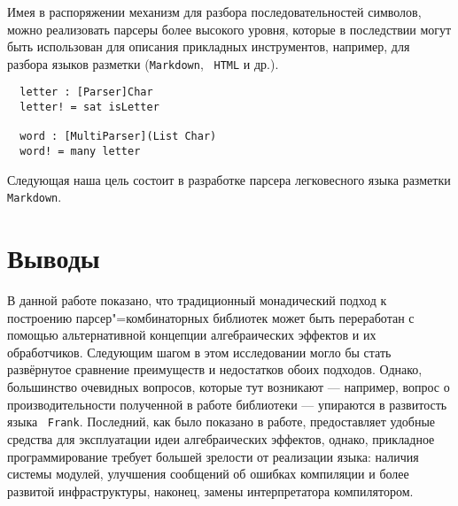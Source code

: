 \documentclass [a4paper] {article}
\begin{document}
Имея в распоряжении механизм для разбора последовательностей символов, можно
реализовать парсеры более высокого уровня, которые в последствии могут быть
использован для описания прикладных инструментов, например, для разбора
языков разметки (\texttt{Markdown}, ~\texttt{HTML} и др.).
\begin{verbatim}
  letter : [Parser]Char
  letter! = sat isLetter

  word : [MultiParser](List Char)
  word! = many letter
\end{verbatim}
Следующая наша цель состоит в разработке парсера легковесного языка разметки
\texttt{Markdown}.

\section{Выводы}

В данной работе показано, что традиционный монадический подход к построению парсер"=комбинаторных библиотек может быть переработан с помощью альтернативной концепции алгебраических эффектов и их обработчиков. Следующим шагом в этом исследовании могло бы стать развёрнутое сравнение преимуществ и недостатков обоих подходов. Однако, большинство очевидных вопросов, которые тут возникают --- например, вопрос о производительности полученной в работе библиотеки --- упираются в развитость языка ~\texttt{Frank}. Последний, как было показано в работе, предоставляет удобные средства для эксплуатации
идеи алгебраических эффектов, однако, прикладное программирование требует большей
зрелости от реализации языка: наличия системы модулей, улучшения сообщений об
ошибках компиляции и более развитой инфраструктуры, наконец, замены интерпретатора компилятором.

\printbibliography

\end{document}
